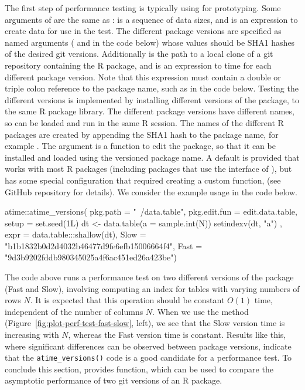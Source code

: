 The first step of performance testing is typically using  for prototyping.
Some arguments of  are the same as :  is a sequence of data sizes, and  is an expression to create data for use in the test. 
The different package versions are specified as named arguments ( and  in the code below) whose values should be SHA1 hashes of the desired git versions.
Additionally  is the path to a local clone of a git repository containing the R package, and  is an expression to time for each different package version.
Note that this expression must contain a double or triple colon reference to the package name, such as  in the code below.
Testing the different versions is implemented by installing different versions of the package, to the same R package library.
The different package versions have different names, so can be loaded and run in the same R session.
The names of the different R packages are created by appending the SHA1 hash to the package name, for example .
The  argument is a function to edit the package, so that it can be installed and loaded using the versioned package name.
A default  is provided that works with most R packages (including packages that use the  interface of \citet{Rcpp}), but  has some special configuration that required creating a custom function,  (see GitHub repository for details). 
We consider the example usage in the code below.
\begin{Schunk}
\begin{Sinput}
atime::atime_versions(
  pkg.path = "~/data.table",
  pkg.edit.fun = edit.data.table, 
  setup = {
    set.seed(1L)
    dt <- data.table(a = sample.int(N))
    setindexv(dt, "a")
  },
  expr = data.table:::shallow(dt),
  Slow = "b1b1832b0d2d4032b46477d9fe6efb15006664f4", 
  Fast = "9d3b9202fddb980345025a4f6ac451ed26a423be")
\end{Sinput}
\end{Schunk}
The code above runs a performance test on two different versions of the  package (Fast and Slow), involving computing an index for tables with varying numbers of rows $N$.
It is expected that this operation should be constant $O(1)$ time, independent of the number of columns $N$.
When we use the  method (Figure~\ref{fig:plot-perf-test-fast-slow}, left), we see that the Slow version time is increasing with $N$, whereas the Fast version time is constant.
Results like this, where significant differences can be observed between package versions, indicate that the \verb|atime_versions()| code is a good candidate for a performance test. 
To conclude this section,  provides  function, which can be used to compare the asymptotic performance of two git versions of an R package.

